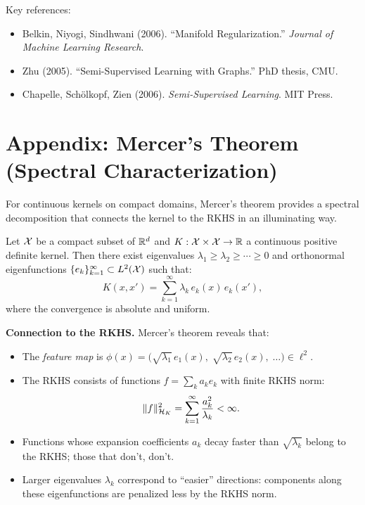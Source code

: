 \begin{notechapter}
\begin{remark}
Key references:
\begin{itemize}
  \item Belkin, Niyogi, Sindhwani (2006). ``Manifold Regularization.'' 
    \emph{Journal of Machine Learning Research}.
  \item Zhu (2005). ``Semi-Supervised Learning with Graphs.'' 
    PhD thesis, CMU.
  \item Chapelle, Sch\"olkopf, Zien (2006). 
    \emph{Semi-Supervised Learning}. MIT Press.
\end{itemize}
\end{remark}
\newpage
\section{Appendix: Mercer's Theorem (Spectral Characterization)}
\label{rkhs:sec:mercer}

For continuous kernels on compact domains, Mercer's theorem provides a
spectral decomposition that connects the kernel to the RKHS in an
illuminating way.

\begin{theorembox}
\begin{theorem}
\label{rkhs:thm:mercer}
Let $\mathcal{X}$ be a compact subset of $\mathbb{R}^d$ and $K: \mathcal{X} \times \mathcal{X} \to \mathbb{R}$ a
continuous positive definite kernel. Then there exist eigenvalues
$\lambda_1 \geq \lambda_2 \geq \cdots \geq 0$ and orthonormal
eigenfunctions $\{e_k\}_{k=1}^\infty \subset L^2(\mathcal{X})$ such that:
\begin{equation}
\label{rkhs:eq:mercer}
K(x,x') = \sum_{k=1}^\infty \lambda_k\, e_k(x)\, e_k(x'),
\end{equation}
where the convergence is absolute and uniform.
\end{theorem}
\end{theorembox}

\textbf{Connection to the RKHS.} Mercer's theorem reveals that:
\begin{itemize}
  \item The \emph{feature map} is $\phi(x) =
  \bigl(\sqrt{\lambda_1}\,e_1(x),\; \sqrt{\lambda_2}\,e_2(x),\;
  \ldots\bigr) \in \ell^2$.
  \item The RKHS consists of functions $f = \sum_k a_k e_k$ with finite
  RKHS norm:
  \begin{equation}
  \| f \|_{\mathcal{H}_K}^2 = \sum_{k=1}^\infty \frac{a_k^2}{\lambda_k} < \infty.
  \end{equation}
  \item Functions whose expansion coefficients $a_k$ decay faster than
  $\sqrt{\lambda_k}$ belong to the RKHS; those that don't, don't.
  \item Larger eigenvalues $\lambda_k$ correspond to ``easier''
  directions: components along these eigenfunctions are penalized less
  by the RKHS norm.
\end{itemize}


\end{notechapter}
